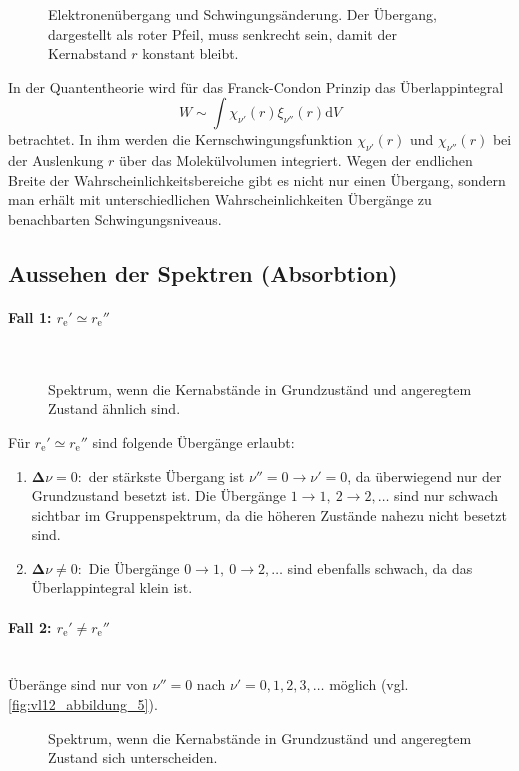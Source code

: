     \begin{figure}[H]
        \centering
        \caption{Elektronenübergang und Schwingungsänderung. Der Übergang, dargestellt als roter Pfeil, muss senkrecht sein, damit der Kernabstand $r$ konstant bleibt.}
        \label{fig:vl12_abbildung_3}
    \end{figure}

    In der Quantentheorie wird für das Franck-Condon Prinzip das Überlappintegral
    $$
    W \sim \int \chi_{\nu'} (r) \xi_{\nu''}(r) \mathrm{d}V
    $$ 
    betrachtet. In ihm werden die Kernschwingungsfunktion $\chi_{\nu'}(r)$ und $\chi_{\nu''}(r)$ bei der Auslenkung $r$ über das Molekülvolumen integriert.
    Wegen der endlichen Breite der Wahrscheinlichkeitsbereiche gibt es nicht nur einen Übergang, sondern man erhält mit unterschiedlichen Wahrscheinlichkeiten Übergänge zu benachbarten Schwingungsniveaus.\\

\subsection{Aussehen der Spektren (Absorbtion)}
\paragraph{Fall 1: $r_{\mathrm{e}}' \simeq r_{\mathrm{e}}''$}~

    \begin{figure}[H]
        \centering
        \caption{Spektrum, wenn die Kernabstände in Grundzuständ und angeregtem Zustand ähnlich sind.}
        \label{fig:vl12_abbildung_4}
    \end{figure}
    Für $r_\mathrm e'\simeq r_\mathrm e''$ sind folgende Übergänge erlaubt:
    \begin{enumerate}
        \item $\bm\Delta\nu=0:$ der stärkste Übergang ist $\nu''=0 \to\nu'=0$, da überwiegend nur der Grundzustand besetzt ist. 
        Die Übergänge $1\to1,~2\to2,  \ldots$ sind nur schwach sichtbar im Gruppenspektrum, da die höheren Zustände nahezu nicht besetzt sind. 
        \item $\bm \Delta\nu\neq0:$ Die Übergänge $0\to1,~0\to2, \ldots$ sind ebenfalls schwach, da das Überlappintegral klein ist. 
    \end{enumerate}

\paragraph{Fall 2: $r_{\mathrm{e}}'\neq r_{\mathrm{e}}''$}~\\
    Überänge sind nur von $\nu''=0$ nach $\nu'=0,1,2,3,\ldots$ möglich (vgl. \autoref{fig:vl12_abbildung_5}). 
    \begin{figure}[H]
        \centering
        \caption{Spektrum, wenn die Kernabstände in Grundzuständ und angeregtem Zustand sich unterscheiden.}
        \label{fig:vl12_abbildung_5}
    \end{figure}

